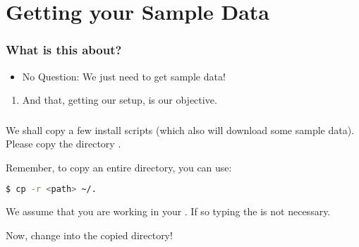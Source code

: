 \section{Getting your Sample Data}
{   
}


\begin{frame}
	\frametitle{What is this about?}
	\begin{question}[Questions]\begin{itemize}
			\item No Question: We just need to get sample data!
		\end{itemize}
	\end{question}
	\begin{docs}[Objectives]
		\begin{enumerate}
			\item And that, getting our setup, is our objective.
		\end{enumerate}
	\end{docs}
\end{frame}

\begin{frame}[fragile]
  \frametitle{}
  We shall copy a few install scripts (which also will download some sample data).\newline
  Please copy the directory .\newline
  \begin{hint}
  	Remember, to copy an entire directory, you can use:
  	\begin{lstlisting}[language=Bash, style=Shell]
$ cp -r <path> ~/.
  	\end{lstlisting}
    We assume that you are working in your . If so typing the \altverb{\~} is not necessary.
  \end{hint}
  \pause
  Now, change into the copied directory!  
\end{frame}

